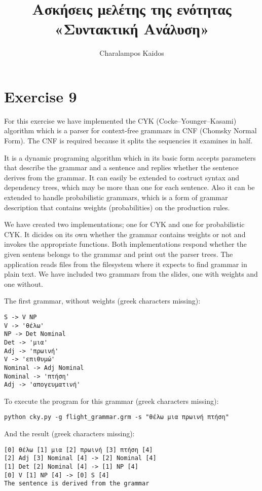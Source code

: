 \documentclass{article}
\begin{document}
\title{Ασκήσεις μελέτης της ενότητας «Συντακτική Ανάλυση»}
\author{Charalampos Kaidos}

\section*{Exercise 9}

For this exercise we have implemented the CYK (Cocke–Younger–Kasami) algorithm
which is a parser for context-free grammars in CNF (Chomsky Normal Form). The
CNF is required because it splits the sequencies it examines in half.

It is a dynamic programing algorithm which in its basic form accepts parameters
that describe the grammar and a sentence and replies whether the sentence
derives from the grammar. It can easily be extended to costruct syntax and
dependency trees, which may be more than one for each sentence. Also it can be
extended to handle probabilistic grammars, which is a form of grammar
description that contains weights (probabilities) on the production rules.

We have created two implementations; one for CYK and one for probabilistic CYK.
It dicides on its own whether the grammar contains weights or not and invokes
the appropriate functions. Both implementations respond whether the given
sentens belongs to the grammar and print out the parser trees. The application
reads files from the filesystem where it expects to find grammar in plain text.
We have included two grammars from the slides, one with weights and one without.

The first grammar, without weights (greek characters missing):
\begin{lstlisting}
S -> V NP
V -> 'θέλω'
NP -> Det Nominal
Det -> 'μια'
Adj -> 'πρωινή'
V -> 'επιθυμώ'
Nominal -> Adj Nominal
Nominal -> 'πτήση'
Adj -> 'απογευματινή'
\end{lstlisting}

To execute the program for this grammar (greek characters missing):
\begin{lstlisting}
python cky.py -g flight_grammar.grm -s "θέλω μια πρωινή πτήση"
\end{lstlisting}

And the result (greek characters missing):
\begin{lstlisting}
[0] θέλω [1] μια [2] πρωινή [3] πτήση [4]
[2] Adj [3] Nominal [4] -> [2] Nominal [4]
[1] Det [2] Nominal [4] -> [1] NP [4]
[0] V [1] NP [4] -> [0] S [4]
The sentence is derived from the grammar
\end{lstlisting}
\end{document}
